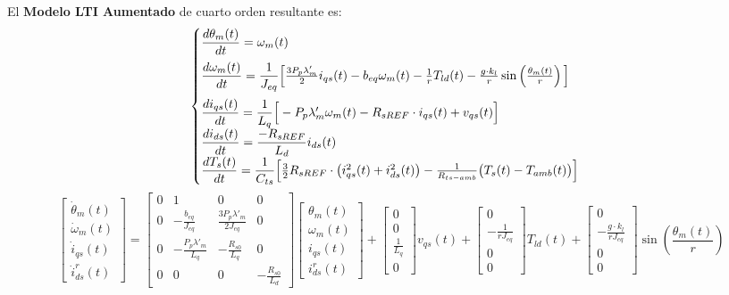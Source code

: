 \documentclass[12pt, a4paper,journal, onecolumn, compsoc]{IEEEtran}
\begin{document}
El \textbf{Modelo LTI Aumentado} de cuarto orden resultante es:
\begin{equation} \label{eq:sis_escalar_LTI_aug}
\begin{cases}
    \vspace{0.2cm}
    \dfrac{d\theta_m(t)}{dt} = \omega_m(t) \\
    \vspace{0.2cm}
    \dfrac{d\omega_m(t)}{dt} = \dfrac{1}{J_{eq}}\Big[\frac{3 P_p \lambda'_m}{2} i_{qs}(t) - b_{eq} \omega_m(t) - \frac{1}{r} T_{ld}(t) - \frac{g\cdot k_l}{r} \sin\left(\frac{\theta_m(t)}{r}\right)\Big] \\
    \dfrac{di_{qs}(t)}{dt} = \dfrac{1}{L_q}\Big[-P_p \lambda'_m \omega_m(t) - R_{sREF}\cdot i_{qs}(t) + v_{qs}(t)\Big] \\
    \dfrac{di_{ds}(t)}{dt} = \dfrac{-R_{sREF}}{L_d}i_{ds}(t)\\
    \dfrac{dT_s(t)}{dt} = \dfrac{1}{C_{ts}}\Big[\frac{3}{2}R_{sREF}\cdot \big(i_{qs}^2(t)+i_{ds}^2(t)\big)-\frac{1}{R_{ts-amb}}\big(T_s(t) - T_{amb}(t)\big)\Big]
\end{cases}
\end{equation}
\begingroup
\renewcommand{\arraystretch}{1.8} 
\footnotesize\begin{equation}
\begin{bmatrix}
\dot{\theta}_m (t)\\
\dot{\omega}_m(t)\\
\dot{i}_{qs}(t)\\
\dot{i}_{ds}^r(t)
\end{bmatrix}
= 
\begin{bmatrix}
0 & 1 & 0 & 0 \\
0  & -\frac{b_{eq}}{J_{eq}} & \frac{3 P_p \lambda'_m}{2 J_{eq}} & 0 \\
 0 &  -\frac{P_p \lambda'_m}{L_q} & -\frac{R_{s0}}{L_q} & 0 \\
 0 & 0 & 0 & -\frac{R_{s0}}{L_d}
\end{bmatrix}
\begin{bmatrix}
\theta_m(t) \\
\omega_m (t)\\
i_{qs}(t) \\
i_{ds}^r(t)
\end{bmatrix}
+
\begin{bmatrix}
0  \\
0  \\
\frac{1}{L_q} \\
0
\end{bmatrix}
v_{qs}(t) 
+
\begin{bmatrix}
0 \\
-\frac{1}{rJ_{eq}} \\
0 \\
0
\end{bmatrix}
T_{ld}(t)
+
\begin{bmatrix}
    0 \\
    -\frac{g\cdot k_l}{rJ_{eq}} \\
    0 \\
    0
\end{bmatrix}
\sin{\left(\frac{\theta_m(t)}{r}\right)}
\end{equation}\normalsize
\endgroup
\end{document}
